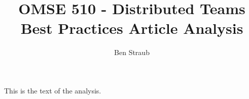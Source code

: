 \documentclass[11pt]{article}
\begin{document}
\title{OMSE 510 - Distributed Teams \\ Best Practices Article Analysis}
\author{Ben Straub}
\maketitle

 This is the text of the analysis.
\end{document}
